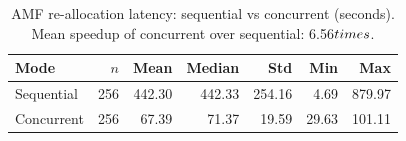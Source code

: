 \begin{table}[htbp]
\centering
\caption{AMF re-allocation latency: sequential vs concurrent (seconds). Mean speedup of concurrent over sequential: 6.56$\\times$.}
\label{tab:comparison}
\begin{tabular}{lrrrrrr}
\hline
Mode & $n$ & Mean & Median & Std & Min & Max \\
\hline
Sequential & 256 & 442.30 & 442.33 & 254.16 & 4.69 & 879.97 \\
Concurrent & 256 & 67.39 & 71.37 & 19.59 & 29.63 & 101.11 \\
\hline
\end{tabular}
\end{table}
